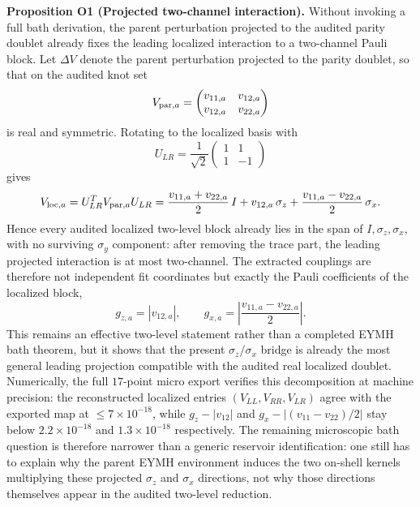 \documentclass[aps,prd,onecolumn,notitlepage,nofootinbib,superscriptaddress,11pt,floatfix]{revtex4-2}
\begin{document}
\medskip\noindent\textbf{Proposition O1 (Projected two-channel interaction).}
Without invoking a full bath derivation, the parent perturbation projected to the audited parity doublet already fixes the leading localized interaction to a two-channel Pauli block. Let $\Delta V$ denote the parent perturbation projected to the parity doublet, so that on the audited knot set
\[
V_{{\rm par},a}=
\begin{pmatrix}
v_{11,a} & v_{12,a}\\
v_{12,a} & v_{22,a}
\end{pmatrix}
\]
is real and symmetric. Rotating to the localized basis with
\[
U_{LR}=\frac{1}{\sqrt2}
\begin{pmatrix}
1&1\\
1&-1
\end{pmatrix}
\]
gives
\[
V_{{\rm loc},a}=U_{LR}^{T}V_{{\rm par},a}U_{LR}
=\frac{v_{11,a}+v_{22,a}}{2}\,I
+v_{12,a}\,\sigma_z
+\frac{v_{11,a}-v_{22,a}}{2}\,\sigma_x.
\]
Hence every audited localized two-level block already lies in the span of $I,\sigma_z,\sigma_x$, with no surviving $\sigma_y$ component: after removing the trace part, the leading projected interaction is at most two-channel. The extracted couplings are therefore not independent fit coordinates but exactly the Pauli coefficients of the localized block,
\[
g_{z,a}=|v_{12,a}|,
\qquad
g_{x,a}=\left|\frac{v_{11,a}-v_{22,a}}{2}\right|.
\]
This remains an effective two-level statement rather than a completed EYMH bath theorem, but it shows that the present $\sigma_z/\sigma_x$ bridge is already the most general leading projection compatible with the audited real localized doublet. Numerically, the full $17$-point micro export verifies this decomposition at machine precision: the reconstructed localized entries $(V_{LL},V_{RR},V_{LR})$ agree with the exported map at $\le 7\times10^{-18}$, while $g_z-|v_{12}|$ and $g_x-\bigl|(v_{11}-v_{22})/2\bigr|$ stay below $2.2\times10^{-18}$ and $1.3\times10^{-18}$ respectively. The remaining microscopic bath question is therefore narrower than a generic reservoir identification: one still has to explain why the parent EYMH environment induces the two on-shell kernels multiplying these projected $\sigma_z$ and $\sigma_x$ directions, not why those directions themselves appear in the audited two-level reduction.
\end{document}
